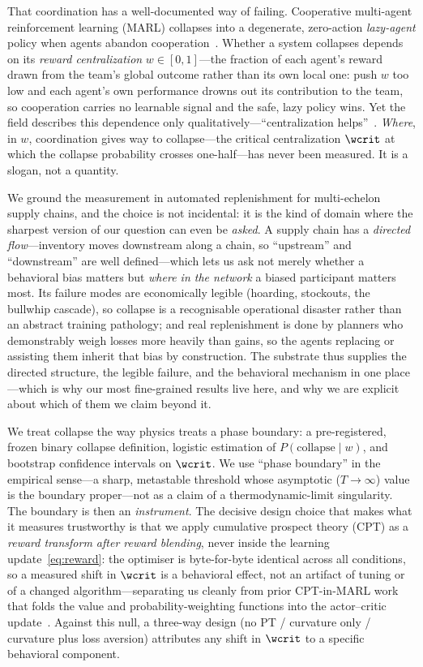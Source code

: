 That coordination has a well-documented way of failing. Cooperative multi-agent
reinforcement learning (MARL) collapses into a degenerate, zero-action
\emph{lazy-agent} policy when agents abandon cooperation~\citep{liu2023lazy,peng2023curo}.
Whether a system collapses depends on its \emph{reward centralization}
$w\in[0,1]$---the fraction of each agent's reward drawn from the team's global
outcome rather than its own local one: push $w$ too low and each agent's own
performance drowns out its contribution to the team, so cooperation carries no
learnable signal and the safe, lazy policy wins. Yet the field describes this
dependence only qualitatively---``centralization helps''~\citep{dmarl2025,liu2023lazy}.
\emph{Where}, in $w$, coordination gives way to collapse---the critical
centralization $\wcrit$ at which the collapse probability crosses one-half---has
never been measured. It is a slogan, not a quantity.

We ground the measurement in automated replenishment for multi-echelon supply
chains, and the choice is not incidental: it is the kind of domain where the
sharpest version of our question can even be \emph{asked}. A supply chain has a
\emph{directed flow}---inventory moves downstream along a chain, so ``upstream''
and ``downstream'' are well defined---which lets us ask not merely whether a
behavioral bias matters but \emph{where in the network} a biased participant
matters most. Its failure modes are economically legible (hoarding,
stockouts, the bullwhip cascade), so collapse is a recognisable operational
disaster rather than an abstract training pathology; and real replenishment is
done by planners who demonstrably weigh losses more heavily than gains, so the
agents replacing or assisting them inherit that bias by construction. The
substrate thus supplies the directed structure, the legible failure, and the
behavioral mechanism in one place---which is why our most fine-grained results
live here, and why we are explicit about which of them we claim beyond it.

We treat collapse the way physics treats a phase boundary: a pre-registered,
frozen binary collapse definition, logistic estimation of
$P(\mathrm{collapse}\mid w)$, and bootstrap confidence intervals on $\wcrit$. We
use ``phase boundary'' in the empirical sense---a sharp, metastable threshold
whose asymptotic ($T\!\to\!\infty$) value is the boundary proper---not as a claim
of a thermodynamic-limit singularity. The boundary is then an \emph{instrument}.
The decisive design choice that makes what it measures trustworthy is that we
apply cumulative prospect theory (CPT) as a \emph{reward transform after reward
blending}, never inside the learning update~\eqref{eq:reward}: the optimiser is
byte-for-byte identical across all conditions, so a measured shift in $\wcrit$ is
a behavioral effect, not an artifact of tuning or of a changed
algorithm---separating us cleanly from prior CPT-in-MARL work that folds the
value and probability-weighting functions into the actor--critic
update~\citep{lalmohammed2025}. Against this null, a three-way design
(no PT / curvature only / curvature plus loss aversion) attributes any shift in
$\wcrit$ to a specific behavioral component.

